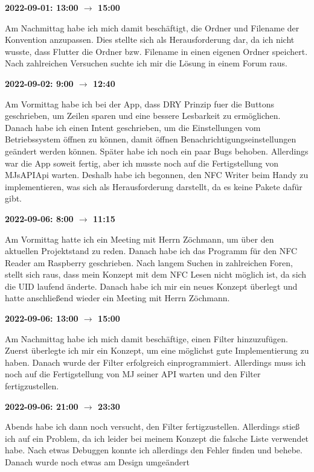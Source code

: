 \vspace{0.5cm} \textbf{2022-09-01: 13:00 $\rightarrow$ 15:00}

Am Nachmittag habe ich mich damit besch\"aftigt, die Ordner und Filename der
Konvention anzupassen. Dies stellte sich als Herausforderung dar, da ich nicht wusste, dass Flutter die Ordner bzw. Filename in einen eigenen Ordner speichert. Nach zahlreichen Versuchen suchte ich mir die Lösung in einem Forum raus.

\vspace{0.5cm} \textbf{2022-09-02: 9:00 $\rightarrow$ 12:40}

Am Vormittag habe ich bei der App, dass DRY Prinzip fuer die
Buttons geschrieben, um Zeilen sparen und eine bessere Lesbarkeit zu
ermöglichen. Danach habe ich einen Intent geschrieben, um die
Einstellungen vom Betriebssystem öffnen zu können, damit öffnen
Benachrichtigungseinstellungen ge\"andert werden können. Sp\"ater habe ich noch ein
paar Bugs behoben. Allerdings war die App soweit fertig, aber ich musste
noch auf die Fertigstellung von MJsAPIApi warten. Deshalb habe ich
begonnen, den NFC Writer beim Handy zu implementieren, was sich als
Herausforderung darstellt, da es keine Pakete dafür gibt.

\vspace{0.5cm} \textbf{2022-09-06: 8:00 $\rightarrow$ 11:15}

Am Vormittag hatte ich ein Meeting mit Herrn Zöchmann, um über den
aktuellen Projektstand zu reden. Danach habe ich das Programm für den
NFC Reader am Raspberry geschrieben. Nach langem Suchen in zahlreichen
Foren, stellt sich raus, dass mein Konzept mit dem NFC Lesen nicht
möglich ist, da sich die UID laufend änderte. Danach habe ich mir ein
neues Konzept überlegt und hatte anschließend wieder ein Meeting mit
Herrn Zöchmann.

\vspace{0.5cm} \textbf{2022-09-06: 13:00 $\rightarrow$ 15:00}

Am Nachmittag habe ich mich damit beschäftige, einen Filter
hinzuzufügen. Zuerst überlegte ich mir ein Konzept, um eine möglichst
gute Implementierung zu haben. Danach wurde der Filter erfolgreich
einprogrammiert. Allerdings muss ich noch auf die Fertigstellung von MJ
seiner API warten und den Filter fertigzustellen.

\vspace{0.5cm} \textbf{2022-09-06: 21:00 $\rightarrow$ 23:30}

Abends habe ich dann noch versucht, den Filter fertigzustellen.
Allerdings stieß ich auf ein Problem, da ich leider bei meinem Konzept
die falsche Liste verwendet habe. Nach etwas Debuggen konnte ich
allerdings den Fehler finden und behebe. Danach wurde noch etwas am
Design umge\"andert

